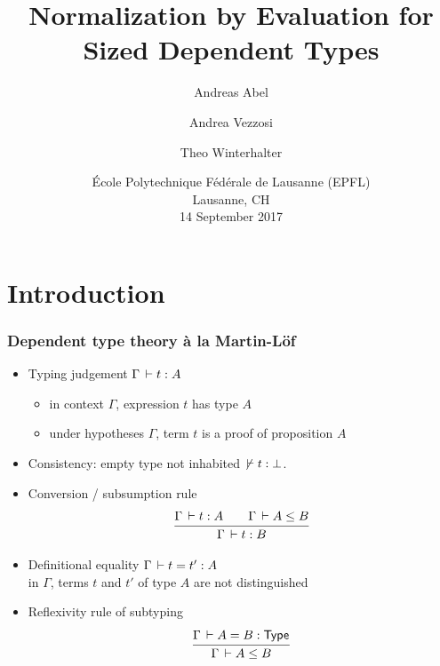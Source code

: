 \documentclass[t,fleqn]{beamer}
\title[NbE for Sized Dependent Types]{%
  Normalization by Evaluation for Sized Dependent Types}
\author[Abel Vezzosi Winterhalter]{
  Andreas Abel\inst{1}
  \and Andrea Vezzosi\inst{1}
  \and Theo Winterhalter\inst{2}
}
\institute[] %
{
  \inst{1}
  Department of Computer Science and Engineering\\
  Chalmers and Gothenburg University, Sweden \\[1ex]

  \inst{2}
  École Normale Supérieure de Cachan, France \\
}
\date[EPFL'17] %
{ École Polytechnique Fédérale de Lausanne (EPFL) \\
  Lausanne, CH \\
  14 September 2017
}
\makeatletter
\renewcommand{\ru}[2]{\dfrac{\begin{array}[b]{@{}c@{}} #1 \end{array}}{\begin{array}[t]{@{}l@{}} #2 \end{array}}}
\def\MLine#1{\par\vspace{1ex}\hspace*{-\@totalleftmargin}\parbox{\textwidth}{\[#1\]}}
\newcommand{\cAnn}{\color{red!80!black}}%
\renewcommand{\emph}[1]{{\cAnn#1}}
\newcommand{\cType}{\color{orange!60!black}}
\makeatother
\begin{document}
\maketitle


%
%
%
%

\renewcommand{\emph}[1]{\textit{\cType#1}}

\section{Introduction}



\begin{frame}%
  \frametitle{Dependent type theory \`a la Martin-Löf}
  \begin{itemize}
  \item Typing judgement $\Gamma \,\vdash t : A$
    \begin{itemize}
    \item in context $\Gamma$, expression $t$ has type $A$
    \item under hypotheses $\Gamma$, term $t$ is a proof of
      proposition $A$
    \end{itemize}
  \item Consistency: empty type not inhabited $\not\,\vdash t : \bot$.
  \item Conversion / subsumption rule
    \[
      \ru{\Gamma \der t : A \qquad \Gamma \der A \leq B
        }{\Gamma \der t : B}
    \]
    \vspace{-2ex}
  \item Definitional equality $\Gamma \,\vdash t = t' : A$ \\
     in $\Gamma$, terms $t$ and $t'$ of type $A$ are not distinguished
  \item Reflexivity rule of subtyping
\[
      \ru{\Gamma \der A = B : \Type
        }{\Gamma \der A \leq B}
\]
  \end{itemize}
\end{frame}
\end{document}
